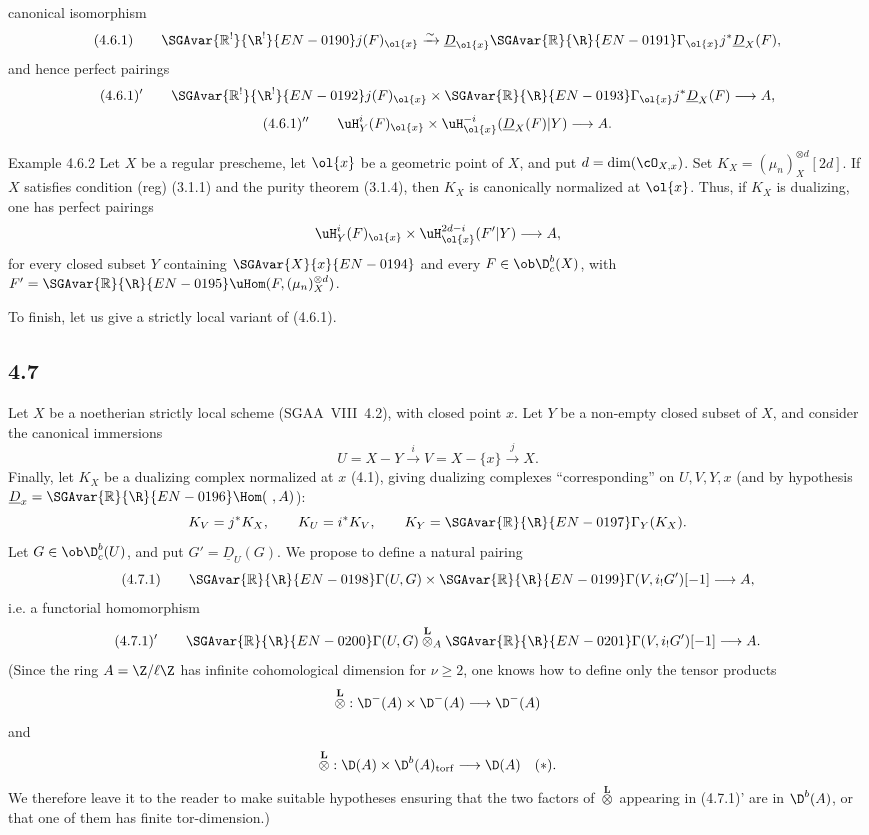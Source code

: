 canonical isomorphism
\[
(4.6.1)\qquad \SGAvar{\mathbb{R}^{!}}{\R^{!}}{EN-0190}j(F)_{\ol{x}}\xrightarrow{\sim}\underline{D}_{\ol{x}}\SGAvar{\mathbb{R}}{\R}{EN-0191}\Gamma_{\ol{x}}j^*\underline{D}_X(F),
\]
and hence perfect pairings
\[
(4.6.1)'\qquad \SGAvar{\mathbb{R}^{!}}{\R^{!}}{EN-0192}j(F)_{\ol{x}}\times \SGAvar{\mathbb{R}}{\R}{EN-0193}\Gamma_{\ol{x}}j^*\underline{D}_X(F)\longrightarrow A,
\]
\[
(4.6.1)''\qquad \uH_Y^i(F)_{\ol{x}}\times \uH_{\ol{x}}^{-i}(\underline{D}_X(F)|Y)\longrightarrow A.
\]

\begin{statement}{Example 4.6.2}
Let $X$ be a regular prescheme, let $\ol{x}$ be a geometric point of $X$, and put $d=\dim(\cO_{X,x})$. Set $K_X=(\mu_n)_X^{\otimes d}[2d]$. If $X$ satisfies condition (reg) (3.1.1) and the purity theorem (3.1.4), then $K_X$ is canonically normalized at $\ol{x}$. Thus, if $K_X$ is dualizing, one has perfect pairings
\[
\uH_Y^i(F)_{\ol{x}}\times \uH_{\ol{x}}^{2d-i}(F'|Y)\longrightarrow A,
\]
for every closed subset $Y$ containing $\SGAvar{X}{x}{EN-0194}$ and every $F\in\ob\D_c^b(X)$, with $F'=\SGAvar{\mathbb{R}}{\R}{EN-0195}\uHom(F,(\mu_n)_X^{\otimes d})$.
\end{statement}

To finish, let us give a strictly local variant of (4.6.1).

\subsection*{4.7}
Let $X$ be a noetherian strictly local scheme (SGAA~VIII~4.2), with closed point $x$. Let $Y$ be a non-empty closed subset of $X$, and consider the canonical immersions
\[
U=X-Y\xrightarrow{i}V=X-\{x\}\xrightarrow{j}X.
\]
Finally, let $K_X$ be a dualizing complex normalized at $x$ (4.1), giving dualizing complexes ``corresponding'' on $U,V,Y,x$ (and by hypothesis $\underline{D}_x=\SGAvar{\mathbb{R}}{\R}{EN-0196}\Hom(\ ,A)$):
\[
K_V=j^*K_X,
\qquad K_U=i^*K_V,
\qquad K_Y=\SGAvar{\mathbb{R}}{\R}{EN-0197}\Gamma_Y(K_X).
\]
Let $G\in\ob\D_c^b(U)$, and put $G'=\underline{D}_U(G)$. We propose to define a natural pairing
\[
(4.7.1)\qquad \SGAvar{\mathbb{R}}{\R}{EN-0198}\Gamma(U,G)\times \SGAvar{\mathbb{R}}{\R}{EN-0199}\Gamma(V,i_!G')[-1]\longrightarrow A,
\]
i.e. a functorial homomorphism
\[
(4.7.1)'\qquad \SGAvar{\mathbb{R}}{\R}{EN-0200}\Gamma(U,G)\overset{\mathbf L}{\otimes}_A\SGAvar{\mathbb{R}}{\R}{EN-0201}\Gamma(V,i_!G')[-1]\longrightarrow A.
\]
(Since the ring $A=\Z/\ell\Z$ has infinite cohomological dimension for $\nu\geqslant2$, one knows how to define only the tensor products
\[
\overset{\mathbf L}{\otimes}:\D^-(A)\times\D^-(A)\longrightarrow\D^-(A)
\]
and
\[
\overset{\mathbf L}{\otimes}:\D(A)\times\D^b(A)_{\mathrm{torf}}\longrightarrow\D(A)\quad(*).
\]
We therefore leave it to the reader to make suitable hypotheses ensuring that the two factors of $\overset{\mathbf L}{\otimes}$ appearing in (4.7.1)' are in $\D^b(A)$, or that one of them has finite tor-dimension.)

